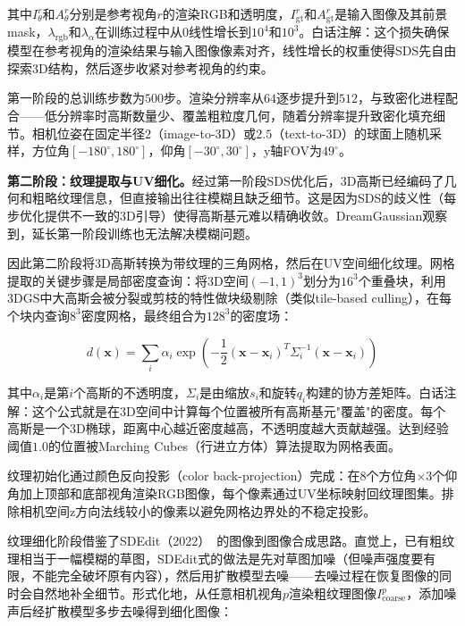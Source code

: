 其中$I^r_\theta$和$A^r_\theta$分别是参考视角$r$的渲染RGB和透明度，$I^r_{\text{gt}}$和$A^r_{\text{gt}}$是输入图像及其前景mask，$\lambda_{\text{rgb}}$和$\lambda_{\alpha}$在训练过程中从$0$线性增长到$10^4$和$10^3$。白话注解：这个损失确保模型在参考视角的渲染结果与输入图像像素对齐，线性增长的权重使得SDS先自由探索3D结构，然后逐步收紧对参考视角的约束。

第一阶段的总训练步数为$500$步。渲染分辨率从$64$逐步提升到$512$，与致密化进程配合——低分辨率时高斯数量少、覆盖粗粒度几何，随着分辨率提升致密化填充细节。相机位姿在固定半径$2$（image-to-3D）或$2.5$（text-to-3D）的球面上随机采样，方位角$[-180^\circ, 180^\circ]$，仰角$[-30^\circ, 30^\circ]$，y轴FOV为$49^\circ$。

\textbf{第二阶段：纹理提取与UV细化。}经过第一阶段SDS优化后，3D高斯已经编码了几何和粗略纹理信息，但直接输出往往模糊且缺乏细节。这是因为SDS的歧义性（每步优化提供不一致的3D引导）使得高斯基元难以精确收敛。DreamGaussian观察到，延长第一阶段训练也无法解决模糊问题。

因此第二阶段将3D高斯转换为带纹理的三角网格，然后在UV空间细化纹理。网格提取的关键步骤是局部密度查询：将3D空间$(-1,1)^3$划分为$16^3$个重叠块，利用3DGS中大高斯会被分裂或剪枝的特性做块级剔除（类似tile-based culling），在每个块内查询$8^3$密度网格，最终组合为$128^3$的密度场：

\begin{equation}
\label{eq:dg_density}
d(\mathbf{x}) = \sum_i \alpha_i \exp\left(-\frac{1}{2}(\mathbf{x} - \mathbf{x}_i)^T \Sigma_i^{-1}(\mathbf{x} - \mathbf{x}_i)\right)
\end{equation}

其中$\alpha_i$是第$i$个高斯的不透明度，$\Sigma_i$是由缩放$s_i$和旋转$q_i$构建的协方差矩阵。白话注解：这个公式就是在3D空间中计算每个位置被所有高斯基元"覆盖"的密度。每个高斯是一个3D椭球，距离中心越近密度越高，不透明度越大贡献越强。达到经验阈值$1.0$的位置被Marching Cubes（行进立方体）算法提取为网格表面。

纹理初始化通过颜色反向投影（color back-projection）完成：在8个方位角$\times$3个仰角加上顶部和底部视角渲染RGB图像，每个像素通过UV坐标映射回纹理图集。排除相机空间z方向法线较小的像素以避免网格边界处的不稳定投影。

纹理细化阶段借鉴了SDEdit（2022）~\cite{2021sdedit}的图像到图像合成思路。直觉上，已有粗纹理相当于一幅模糊的草图，SDEdit式的做法是先对草图加噪（但噪声强度要有限，不能完全破坏原有内容），然后用扩散模型去噪——去噪过程在恢复图像的同时会自然地补全细节。形式化地，从任意相机视角$p$渲染粗纹理图像$I^p_\text{coarse}$，添加噪声后经扩散模型多步去噪得到细化图像：

